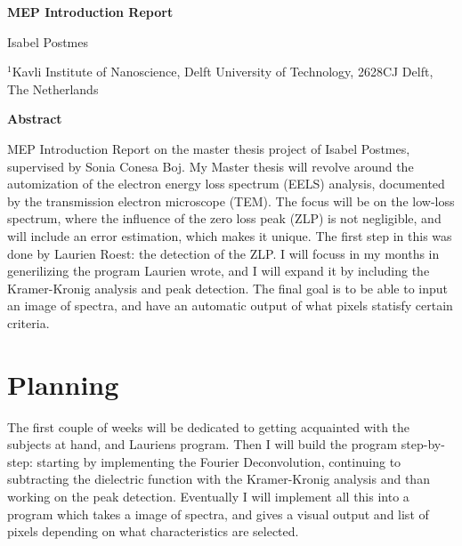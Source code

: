 \documentclass[12pt,a4paper]{article}
\numberwithin{equation}{section}
\numberwithin{figure}{section}
\numberwithin{table}{section}
\begin{document}




\begin{center}
  {\Large \bf MEP Introduction Report}
\vspace{1.4cm}

Isabel Postmes

\vspace{1.0cm}
 
{\it \small

$^{1}$Kavli Institute of Nanoscience, Delft University of Technology, 2628CJ Delft, The
  Netherlands\\[0.1cm]

}

\vspace{1.0cm}

{\bf \large Abstract}

\end{center}

MEP Introduction Report on the master thesis project of Isabel Postmes, supervised by Sonia Conesa Boj.
My Master thesis will revolve around the automization of the electron energy loss spectrum (EELS) analysis, documented by the transmission electron microscope (TEM). The focus will be on the low-loss spectrum, where the influence of the zero loss peak (ZLP) is not negligible, and will include an error estimation, which makes it unique. The first step in this was done by Laurien Roest: the detection of the ZLP. I will focuss in my months in generilizing the program Laurien wrote, and I will expand it by including the Kramer-Kronig analysis and peak detection. The final goal is to be able to input an image of spectra, and have an automatic output of what pixels statisfy certain criteria. 



\clearpage
\tableofcontents

\section{Planning}
The first couple of weeks will be dedicated to getting acquainted with the subjects at hand, and Lauriens program. Then I will build the program step-by-step: starting by implementing the Fourier Deconvolution, continuing to subtracting the dielectric function with the Kramer-Kronig analysis and than working on the peak detection. Eventually I will implement all this into a program which takes a image of spectra, and gives a visual output and list of pixels depending on what characteristics are selected. 
\end{document}

